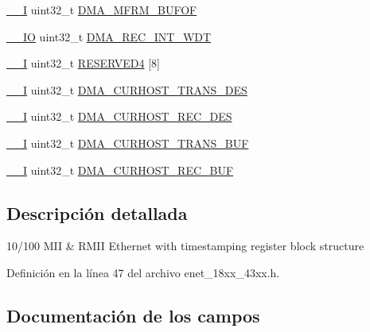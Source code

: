 \begin{DoxyCompactItemize}
\hyperlink{core__sc300_8h_af63697ed9952cc71e1225efe205f6cd3}{\+\_\+\+\_\+I} uint32\+\_\+t \hyperlink{struct_l_p_c___e_n_e_t___t_ab2843bad2081373b2b9383feed5e0352}{D\+M\+A\+\_\+\+M\+F\+R\+M\+\_\+\+B\+U\+F\+OF}
\item 
\hyperlink{core__sc300_8h_aec43007d9998a0a0e01faede4133d6be}{\+\_\+\+\_\+\+IO} uint32\+\_\+t \hyperlink{struct_l_p_c___e_n_e_t___t_a021334d2aef9e143340df29af715367b}{D\+M\+A\+\_\+\+R\+E\+C\+\_\+\+I\+N\+T\+\_\+\+W\+DT}
\item 
\hyperlink{core__sc300_8h_af63697ed9952cc71e1225efe205f6cd3}{\+\_\+\+\_\+I} uint32\+\_\+t \hyperlink{struct_l_p_c___e_n_e_t___t_a944ffea0e77c1cf36c7b047b3466882c}{R\+E\+S\+E\+R\+V\+E\+D4} \mbox{[}8\mbox{]}
\item 
\hyperlink{core__sc300_8h_af63697ed9952cc71e1225efe205f6cd3}{\+\_\+\+\_\+I} uint32\+\_\+t \hyperlink{struct_l_p_c___e_n_e_t___t_a9214a88d4779eb10d652d24c10d3531d}{D\+M\+A\+\_\+\+C\+U\+R\+H\+O\+S\+T\+\_\+\+T\+R\+A\+N\+S\+\_\+\+D\+ES}
\item 
\hyperlink{core__sc300_8h_af63697ed9952cc71e1225efe205f6cd3}{\+\_\+\+\_\+I} uint32\+\_\+t \hyperlink{struct_l_p_c___e_n_e_t___t_aecef9f7800c06899023606cc352b151b}{D\+M\+A\+\_\+\+C\+U\+R\+H\+O\+S\+T\+\_\+\+R\+E\+C\+\_\+\+D\+ES}
\item 
\hyperlink{core__sc300_8h_af63697ed9952cc71e1225efe205f6cd3}{\+\_\+\+\_\+I} uint32\+\_\+t \hyperlink{struct_l_p_c___e_n_e_t___t_aa5c1101290be204ef6aec67d60e8dd46}{D\+M\+A\+\_\+\+C\+U\+R\+H\+O\+S\+T\+\_\+\+T\+R\+A\+N\+S\+\_\+\+B\+UF}
\item 
\hyperlink{core__sc300_8h_af63697ed9952cc71e1225efe205f6cd3}{\+\_\+\+\_\+I} uint32\+\_\+t \hyperlink{struct_l_p_c___e_n_e_t___t_a6b18526fc348ba9b375236583e9fe7e4}{D\+M\+A\+\_\+\+C\+U\+R\+H\+O\+S\+T\+\_\+\+R\+E\+C\+\_\+\+B\+UF}
\end{DoxyCompactItemize}


\subsection{Descripción detallada}
10/100 M\+II \& R\+M\+II Ethernet with timestamping register block structure 

Definición en la línea 47 del archivo enet\+\_\+18xx\+\_\+43xx.\+h.



\subsection{Documentación de los campos}

